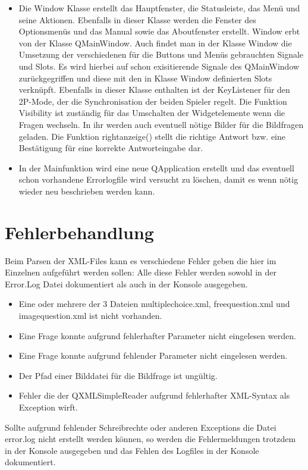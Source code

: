 \documentclass[10pt,a4paper,titlepage]{article}
\begin{document}
\begin{itemize}
	\item Die Window Klasse erstellt das Hauptfenster, die Statusleiste, das Menü und seine Aktionen.
	Ebenfalls in dieser Klasse werden die Fenster des Optionsmenüs und das Manual sowie das Aboutfenster erstellt.
	Window erbt von der Klasse QMainWindow.
	Auch findet man in der Klasse Window die Umsetzung der verschiedenen für die Buttons und Menüs gebrauchten Signale und Slots.
	Es wird hierbei auf schon exisitierende Signale des QMainWindow zurückgegriffen und diese mit den in Klasse Window definierten Slots verknüpft.
	Ebenfalls in dieser Klasse enthalten ist der KeyListener für den 2P-Mode, der die Synchronisation der beiden Spieler regelt.
	Die Funktion Visibility ist zuständig für das Umschalten der Widgetelemente wenn die Fragen wechseln.
	In ihr werden auch eventuell nötige Bilder für die Bildfragen geladen.
	Die Funktion rightanzeige() stellt die richtige Antwort bzw. eine Bestätigung für eine korrekte Antworteingabe dar.
	\item In der Mainfunktion wird eine neue QApplication erstellt und das eventuell schon vorhandene Errorlogfile wird versucht zu löschen, damit es wenn nötig wieder neu beschrieben werden kann.
\end{itemize}
\section{Fehlerbehandlung}
Beim Parsen der XML-Files kann es verschiedene Fehler geben die hier im Einzelnen aufgeführt werden sollen:
Alle diese Fehler werden sowohl in der Error.Log Datei dokumentiert als auch in der Konsole ausgegeben.
\begin{itemize}
	\item Eine oder mehrere der 3 Dateien multiplechoice.xml, freequestion.xml und imagequestion.xml ist nicht vorhanden.
	\item Eine Frage konnte aufgrund fehlerhafter Parameter nicht eingelesen werden.
	\item Eine Frage konnte aufgrund fehlender Parameter nicht eingelesen werden.
	\item Der Pfad einer Bilddatei für die Bildfrage ist ungültig.
	\item Fehler die der QXMLSimpleReader aufgrund fehlerhafter XML-Syntax als Exception wirft.
\end{itemize}

Sollte aufgrund fehlender Schreibrechte oder anderen Exceptions die Datei error.log nicht erstellt werden können, so werden die Fehlermeldungen trotzdem in der Konsole ausgegeben und das Fehlen des Logfiles in der Konsole dokumentiert.
\end{document}
